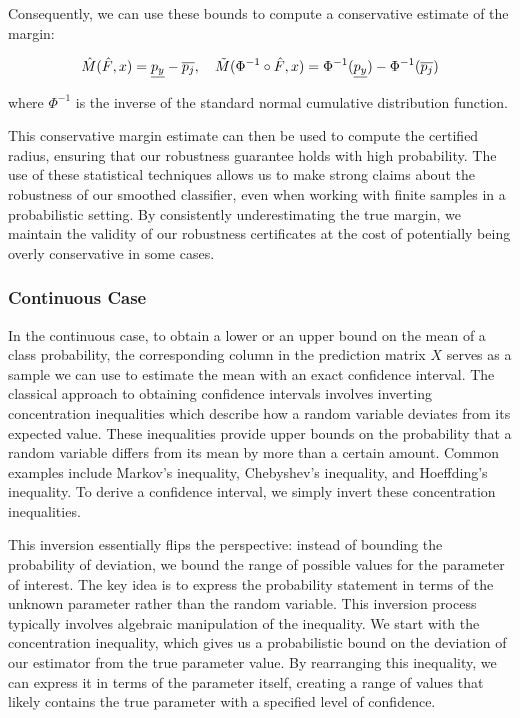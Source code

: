 Consequently, we can use these bounds to compute a conservative estimate of the margin:

\begin{equation}
    \Hat{M}(\Hat{F},x)= \underline{p_y} - \overline{p_j}, \quad\tilde{M}(\Phi^{-1}\circ\Hat{F},x) = \Phi^{-1}(\underline{p_y}) - \Phi^{-1}(\overline{p_j})\label{eq:clopper-pearson}
\end{equation}

where $\Phi^{-1}$ is the inverse of the standard normal cumulative distribution function.

This conservative margin estimate can then be used to compute the certified radius, ensuring that our robustness guarantee holds with high probability.
The use of these statistical techniques allows us to make strong claims about the robustness of our smoothed classifier, even when working with finite samples in a probabilistic setting.
By consistently underestimating the true margin, we maintain the validity of our robustness certificates at the cost of potentially being overly conservative in some cases.

\subsubsection{Continuous Case}\label{subsubsec:continuous-case}
In the continuous case, to obtain a lower or an upper bound on the mean of a class probability, the corresponding column in the prediction matrix $X$ serves as a sample we can use to estimate the mean with an exact confidence interval.
The classical approach to obtaining confidence intervals involves inverting concentration inequalities which describe how a random variable deviates from its expected value.
These inequalities provide upper bounds on the probability that a random variable differs from its mean by more than a certain amount.
Common examples include Markov's inequality, Chebyshev's inequality, and Hoeffding's inequality.
To derive a confidence interval, we simply invert these concentration inequalities.

This inversion essentially flips the perspective: instead of bounding the probability of deviation, we bound the range of possible values for the parameter of interest.
The key idea is to express the probability statement in terms of the unknown parameter rather than the random variable.
This inversion process typically involves algebraic manipulation of the inequality.
We start with the concentration inequality, which gives us a probabilistic bound on the deviation of our estimator from the true parameter value.
By rearranging this inequality, we can express it in terms of the parameter itself, creating a range of values that likely contains the true parameter with a specified level of confidence.

